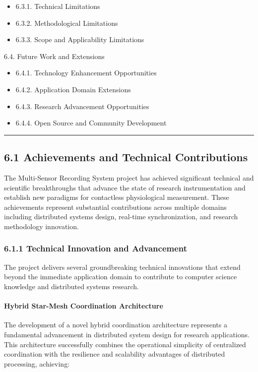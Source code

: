 \documentclass[11pt,a4paper]{article}
\begin{document}
\begin{itemize}
\item 6.3.1. Technical Limitations
\item 6.3.2. Methodological Limitations
\item 6.3.3. Scope and Applicability Limitations

\end{itemize}
6.4. Future Work and Extensions

\begin{itemize}
\item 6.4.1. Technology Enhancement Opportunities
\item 6.4.2. Application Domain Extensions
\item 6.4.3. Research Advancement Opportunities
\item 6.4.4. Open Source and Community Development

\end{itemize}
\hrule

\subsection{6.1 Achievements and Technical Contributions}

The Multi-Sensor Recording System project has achieved significant technical and scientific breakthroughs that advance
the state of research instrumentation and establish new paradigms for contactless physiological measurement. These
achievements represent substantial contributions across multiple domains including distributed systems design, real-time
synchronization, and research methodology innovation.

\subsubsection{6.1.1 Technical Innovation and Advancement}

The project delivers several groundbreaking technical innovations that extend beyond the immediate application domain to
contribute to computer science knowledge and distributed systems research.

\paragraph{Hybrid Star-Mesh Coordination Architecture}

The development of a novel hybrid coordination architecture represents a fundamental advancement in distributed system
design for research applications. This architecture successfully combines the operational simplicity of centralized
coordination with the resilience and scalability advantages of distributed processing, achieving:
\end{document}
